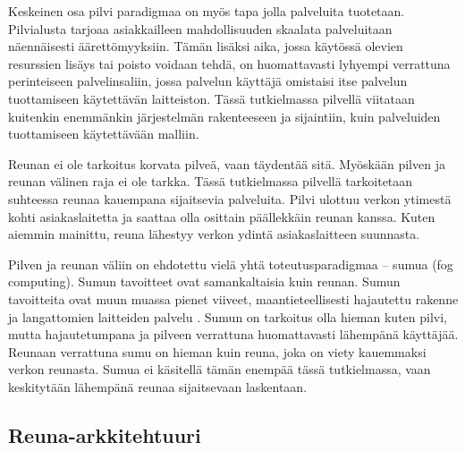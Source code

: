 Keskeinen osa pilvi paradigmaa on myös tapa jolla palveluita tuotetaan.
Pilvialusta tarjoaa asiakkailleen mahdollisuuden skaalata palveluitaan näennäisesti äärettömyyksiin.
Tämän lisäksi aika, jossa käytössä olevien resurssien lisäys tai poisto voidaan tehdä, on huomattavasti lyhyempi verrattuna perinteiseen palvelinsaliin, jossa palvelun käyttäjä omistaisi itse palvelun tuottamiseen käytettävän laitteiston.
Tässä tutkielmassa pilvellä viitataan kuitenkin enemmänkin järjestelmän rakenteeseen ja sijaintiin, kuin palveluiden tuottamiseen käytettävään malliin.

Reunan ei ole tarkoitus korvata pilveä, vaan täydentää sitä. Myöskään pilven ja reunan välinen raja ei ole tarkka. Tässä tutkielmassa pilvellä tarkoitetaan suhteessa reunaa kauempana sijaitsevia palveluita. Pilvi ulottuu verkon ytimestä kohti asiakaslaitetta ja saattaa olla osittain päällekkäin reunan kanssa. Kuten aiemmin mainittu, reuna lähestyy verkon ydintä asiakaslaitteen suunnasta. 

Pilven ja reunan väliin on ehdotettu vielä yhtä toteutusparadigmaa – sumua (fog computing).
Sumun tavoitteet ovat samankaltaisia kuin reunan. Sumun tavoitteita ovat muun muassa pienet viiveet, maantieteellisesti hajautettu rakenne ja langattomien laitteiden palvelu \cite{bonomi2012fog}. Sumun on tarkoitus olla hieman kuten pilvi, mutta hajautetumpana ja pilveen verrattuna huomattavasti lähempänä käyttäjää. Reunaan verrattuna sumu on hieman kuin reuna, joka on viety kauemmaksi verkon reunasta.
Sumua ei käsitellä tämän enempää tässä tutkielmassa, vaan keskitytään lähempänä reunaa sijaitsevaan laskentaan.






\subsection{Reuna-arkkitehtuuri}


